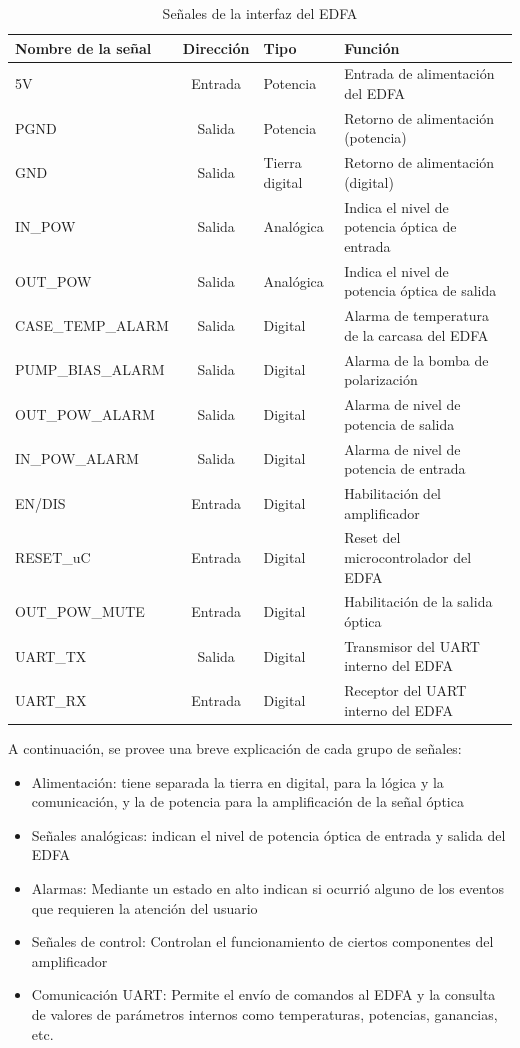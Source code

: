 \begin{table}[H]
	\centering
	\caption{Señales de la interfaz del EDFA}
	\begin{tabular}{l c p{1.5cm} p{5cm}}
		\toprule
		\textbf{Nombre de la señal}	& \textbf{Dirección}	& \textbf{Tipo} & \textbf{Función} \\
		\midrule
		5V 					& Entrada	& Potencia			& Entrada de alimentación del EDFA \\		
		PGND				& Salida	& Potencia  		& Retorno de alimentación (potencia) \\
		GND					& Salida	& Tierra digital  	& Retorno de alimentación (digital) \\
		IN\_POW				& Salida	& Analógica 		& Indica el nivel de potencia óptica de entrada \\
		OUT\_POW			& Salida	& Analógica 		& Indica el nivel de potencia óptica de salida \\
		CASE\_TEMP\_ALARM	& Salida	& Digital 			& Alarma de temperatura de la carcasa del EDFA \\
		PUMP\_BIAS\_ALARM	& Salida	& Digital 			& Alarma de la bomba de polarización \\
		OUT\_POW\_ALARM		& Salida	& Digital 			& Alarma de nivel de potencia de salida \\
		IN\_POW\_ALARM		& Salida	& Digital 			& Alarma de nivel de potencia de entrada \\
		EN/DIS				& Entrada	& Digital 			& Habilitación del amplificador \\
		RESET\_uC			& Entrada	& Digital 			& Reset del microcontrolador del EDFA \\
		OUT\_POW\_MUTE		& Entrada	& Digital 			& Habilitación de la salida óptica \\
		UART\_TX			& Salida	& Digital 			& Transmisor del UART interno del EDFA \\
		UART\_RX			& Entrada	& Digital 			& Receptor del UART interno del EDFA \\
		\bottomrule
		\hline
	\end{tabular}
	\label{tab:señalesConector}
\end{table}

A continuación, se provee una breve explicación de cada grupo de señales:
\begin{itemize}
\item Alimentación: tiene separada la tierra en digital, para la lógica y la comunicación, y la de potencia para la amplificación de la señal óptica
\item Señales analógicas: indican el nivel de potencia óptica de entrada y salida del EDFA
\item Alarmas: Mediante un estado en alto indican si ocurrió alguno de los eventos que requieren la atención del usuario
\item Señales de control: Controlan el funcionamiento de ciertos componentes del amplificador
\item Comunicación UART: Permite el envío de comandos al EDFA y la consulta de valores de parámetros internos como temperaturas, potencias, ganancias, etc.
\end{itemize}

